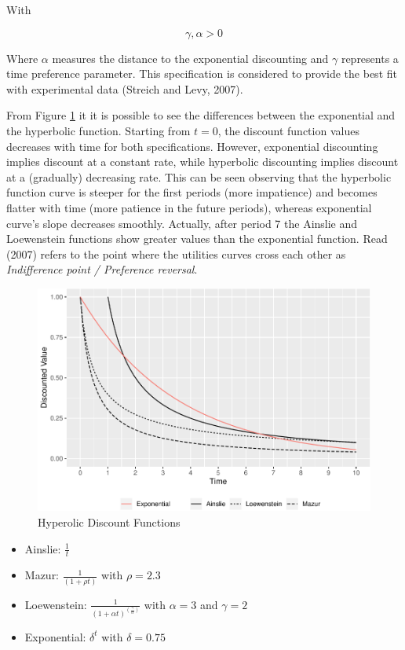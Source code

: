 \documentclass[]{article}
\providecommand{\tightlist}{%
  \setlength{\itemsep}{0pt}\setlength{\parskip}{0pt}}
\begin{document}
With

\[
\gamma, \alpha > 0
\]

Where \(\alpha\) measures the distance to the exponential discounting and \(\gamma\) represents a time preference parameter. This specification is considered to provide the best fit with experimental data (Streich and Levy, 2007).

From Figure \ref{fig:hyp} it it is possible to see the differences between the exponential and the hyperbolic function. Starting from \(t=0\), the discount function values decreases with time for both specifications. However, exponential discounting implies discount at a constant rate, while hyperbolic discounting implies discount at a (gradually) decreasing rate. This can be seen observing that the hyperbolic function curve is steeper for the first periods (more impatience) and becomes flatter with time (more patience in the future periods), whereas exponential curve's slope decreases smoothly. Actually, after period 7 the Ainslie and Loewenstein functions show greater values than the exponential function. Read (2007) refers to the point where the utilities curves cross each other as \emph{Indifference point / Preference reversal}.

\begin{figure}

{\centering \includegraphics[width=0.75\linewidth]{Behavioral_v_pdf_files/figure-latex/hyp-1} 

}

\caption{Hyperolic Discount Functions}\label{fig:hyp}
\end{figure}

\begin{itemize}
\tightlist
\item
  Ainslie: \(\frac{1}{t}\)
\item
  Mazur: \(\frac{1}{(1+ \rho t)}\) with \(\rho = 2.3\)
\item
  Loewenstein: \(\frac{1}{(1+ \alpha t)^(\frac{\gamma}{\alpha})}\) with \(\alpha = 3\) and \(\gamma = 2\)
\item
  Exponential: \(\delta^t\) with \(\delta = 0.75\)
\end{itemize}
\end{document}
